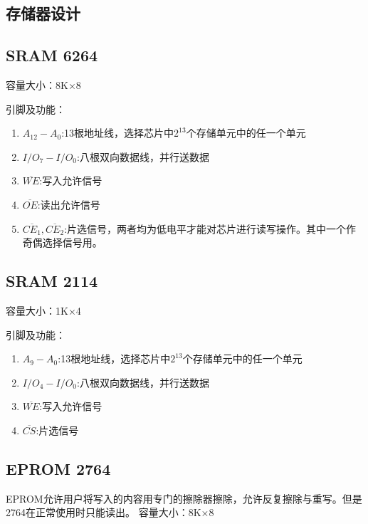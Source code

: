 \subsection{存储器设计}
\subsection{SRAM 6264}
容量大小：8K×8

引脚及功能：
\begin{enumerate}
    \item $A_{12}-A_0$:13根地址线，选择芯片中$2^{13}$个存储单元中的任一个单元
    \item $I/O_7-I/O_0$:八根双向数据线，并行送数据
    \item $\overline{WE}$:写入允许信号
    \item $\overline{OE}$:读出允许信号
    \item $\overline{CE_1},\overline{CE_2}$:片选信号，两者均为低电平才能对芯片进行读写操作。其中一个作奇偶选择信号用。
\end{enumerate}
\subsection{SRAM 2114}
容量大小：1K×4

引脚及功能：
\begin{enumerate}
    \item $A_{9}-A_0$:13根地址线，选择芯片中$2^{13}$个存储单元中的任一个单元
    \item $I/O_4-I/O_0$:八根双向数据线，并行送数据
    \item $\overline{WE}$:写入允许信号
    \item $\overline{CS}$:片选信号
\end{enumerate}
\subsection{EPROM 2764}
EPROM允许用户将写入的内容用专门的擦除器擦除，允许反复擦除与重写。但是2764在正常使用时只能读出。
容量大小：8K×8

